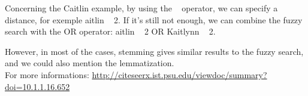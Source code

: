 \documentclass[a4paper]{article}
\begin{document}
Concerning the Caitlin example, by using the ~ operator, we can specify a distance, for exemple aitlin ~ 2. If it's still not enough, we can combine the fuzzy search with the OR operator: aitlin ~ 2 OR Kaitlynn ~ 2.

However, in most of the cases, stemming gives similar results to the fuzzy search, and we could also mention the lemmatization.\\

For more informations: \url{http://citeseerx.ist.psu.edu/viewdoc/summary?doi=10.1.1.16.652} 
\end{document}
